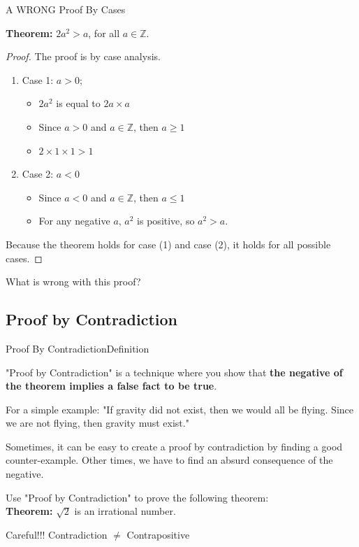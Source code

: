 \begin{frame}{A WRONG Proof By Cases}

  {\bf Theorem:} $2a^2 > a$, for all $a\in \mathbb{Z}$.

  \begin{proof}
    The proof is by case analysis.
  \begin{enumerate}
    \item Case 1: $a > 0$;
    \begin{itemize}
      \item $2a^2$ is equal to $2a\times a$
      \item Since $a > 0$ and $a \in \mathbb{Z}$, then $a \geq 1$
      \item $2\times 1\times 1 > 1$
    \end{itemize}
    \item Case 2: $a < 0$
    \begin{itemize}
      \item Since $a < 0$ and $a \in \mathbb{Z}$, then $a \leq 1$
      \item For any negative $a$, $a^2$ is positive, so $a^2 > a$.
    \end{itemize}
    \end{enumerate}
    Because the theorem holds for case (1) and case (2), it holds for all possible cases.
  \end{proof}
  \bigskip

  What is wrong with this proof?
\end{frame}

\subsection{Proof by Contradiction}
\begin{frame}[t]{Proof By Contradiction}{Definition}

  "Proof by Contradiction" is a technique where you show that {\bf the negative of the theorem implies a false fact to be true}.\bigskip

  For a simple example: "If gravity did not exist, then we would all be flying. Since we are not flying, then gravity must exist."\bigskip

  Sometimes, it can be easy to create a proof by contradiction by finding a good counter-example. Other times, we have to find an absurd consequence of the negative.\bigskip

  Use "Proof by Contradiction" to prove the following theorem:\\
  {\bf Theorem:} $\sqrt{2}$ is an irrational number.

  \begin{alertblock}{}
    Careful!!! Contradiction $\neq$ Contrapositive
  \end{alertblock}
\end{frame}



